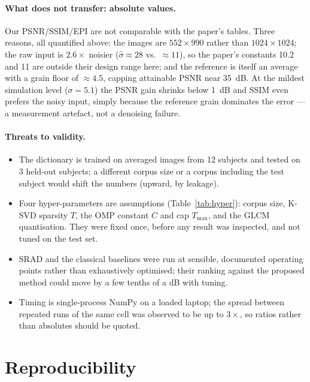 \documentclass[11pt,a4paper]{article}
\newcommand{\sh}{\hat{\sigma}}
\begin{document}
\paragraph{What does not transfer: absolute values.}
Our PSNR/SSIM/EPI are not comparable with the paper's tables. Three reasons, all quantified above: the images are
$552\times990$ rather than $1024\times1024$; the raw input is $2.6\times$ noisier ($\sh\approx28$ vs.\ $\approx11$),
so the paper's constants 10.2 and 11 are outside their design range here; and the reference is itself an average
with a grain floor of $\approx4.5$, capping attainable PSNR near 35~dB. At the mildest simulation level
($\sigma=5.1$) the PSNR gain shrinks below 1~dB and SSIM even prefers the noisy input, simply because the reference
grain dominates the error --- a measurement artefact, not a denoising failure.

\paragraph{Threats to validity.}
\begin{itemize}
  \item The dictionary is trained on averaged images from 12 subjects and tested on 3 held-out subjects; a
        different corpus size or a corpus including the test subject would shift the numbers (upward, by leakage).
  \item Four hyper-parameters are assumptions (Table~\ref{tab:hyper}): corpus size, K-SVD sparsity $T$, the OMP
        constant $C$ and cap $T_{\max}$, and the GLCM quantisation. They were fixed once, before any result was
        inspected, and not tuned on the test set.
  \item SRAD and the classical baselines were run at sensible, documented operating points rather than exhaustively
        optimised; their ranking against the proposed method could move by a few tenths of a dB with tuning.
  \item Timing is single-process NumPy on a loaded laptop; the spread between repeated runs of the same cell was
        observed to be up to $3\times$, so ratios rather than absolutes should be quoted.
\end{itemize}

\section{Reproducibility}\label{sec:repro}
\end{document}
